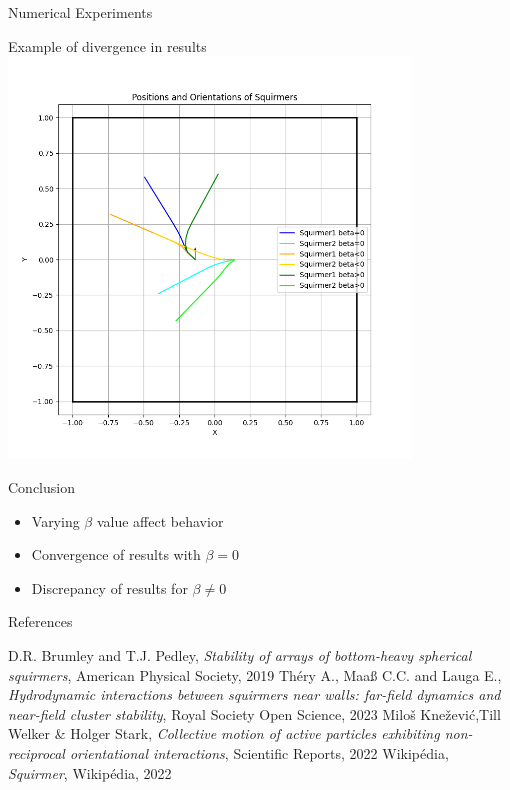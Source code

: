 \documentclass{beamer}
\begin{document}
\begin{frame}{Numerical Experiments}
    \begin{center}
        Example of divergence in results
        \includegraphics[width=0.8\textwidth]{../../graphs/simulations/twosquirmerinter/sq2.pi.png}
    \end{center}
\end{frame}

\begin{frame}{Conclusion}
    \begin{center}
        \begin{itemize}
            \item Varying $\beta$ value affect behavior
            \item Convergence of results with $\beta = 0$
            \item Discrepancy of results for $\beta \ne 0$
        \end{itemize}
    \end{center}
\end{frame}

\begin{frame}{References}
    \begin{thebibliography}{}
         D.R. Brumley and T.J. Pedley, \emph{Stability of arrays of bottom-heavy spherical squirmers}, American Physical Society, 2019
         Théry A., Maaß C.C. and Lauga E., \emph{Hydrodynamic interactions between squirmers near walls: far-field dynamics and near-field cluster stability}, Royal Society Open Science, 2023
         Miloš Knežević,Till Welker \& Holger Stark, \emph{Collective motion of active particles exhibiting non-reciprocal orientational interactions}, Scientific Reports, 2022
         Wikipédia, \emph{Squirmer}, Wikipédia, 2022
    \end{thebibliography}
\end{frame}
\end{document}
